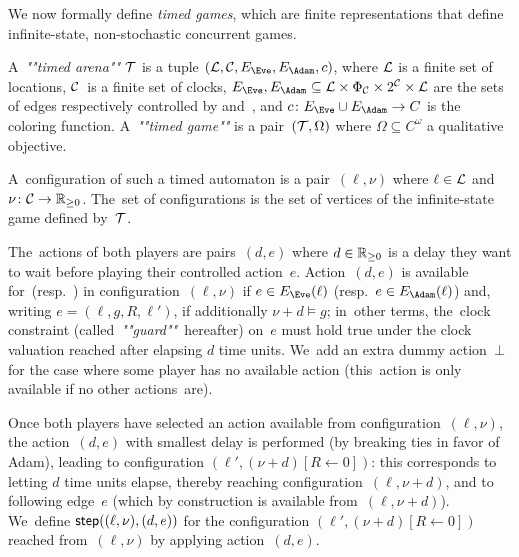 We now formally define \emph{timed games}, which are finite
representations that define infinite-state, non-stochastic concurrent
games. 

\begin{definition}
  A~\emph{""timed arena""} $\mathcal T$ is a tuple $(\Locs,
  \Clocks,\EE,\EA, c)$, where $\mathcal{L}$ is a finite set of locations,
  $\mathcal{C}$~is a finite set of clocks, $\EE,\EA \subseteq \Locs \times
  \Phi_\Clocks \times 2^\Clocks \times \mathcal{L}$ are the sets of
  edges respectively controlled by \Eve and~\Adam,
  and $c\colon \EE\cup\EA \to C$ is the coloring function.
  A~\emph{""timed game""} is a pair~$(\mathcal T,\Omega)$ where
  $\Omega \subseteq C^\omega$ a qualitative objective.
\end{definition}


A~configuration of such a timed automaton is a pair~$(\ell,\nu)$ where
$\ell\in\mathcal{L}$ and $\nu\colon \mathcal{C}\to\mathbb{R}_{\geq 0}$.  The~set of
configurations is the set of vertices of the infinite-state game
defined by~$\mathcal T$.

The~actions of both players are pairs~$(d,e)$ where $d\in\mathbb{R}_{\geq 0}$ is a
delay they want to wait before playing their controlled
action~$e$. Action~$(d,e)$ is available for~\Eve (resp.~\Adam) in
configuration~$(\ell,\nu)$ if $e\in\EE(\ell)$ (resp.~$e\in\EA(\ell)$)
and, writing $e=(\ell,g,R,\ell')$, if additionally $\nu+d\models g$;
in~other terms, the~clock constraint (called~\emph{""guard""}~hereafter)
on~$e$ must hold true under the clock valuation reached after elapsing
$d$ time units. We~add an extra dummy action~$\bot$ for the case where
some player has no available action (this~action is only available if
no other actions~are).

Once both players have selected an action available from
configuration~$(\ell,\nu)$, the action~$(d,e)$ with smallest delay is
performed (by breaking ties in favor of Adam), leading to configuration $(\ell',(\nu+d)[R\leftarrow 0])$:
this corresponds to letting $d$ time units elapse, thereby reaching
configuration~$(\ell,\nu+d)$, and to following edge~$e$ (which by
construction is available from~$(\ell,\nu+d)$).  We~define
$\mathsf{step}((\ell,\nu),(d,e))$ for the configuration
$(\ell',(\nu+d)[R\leftarrow 0])$ reached from~$(\ell,\nu)$ by applying
action~$(d,e)$.



